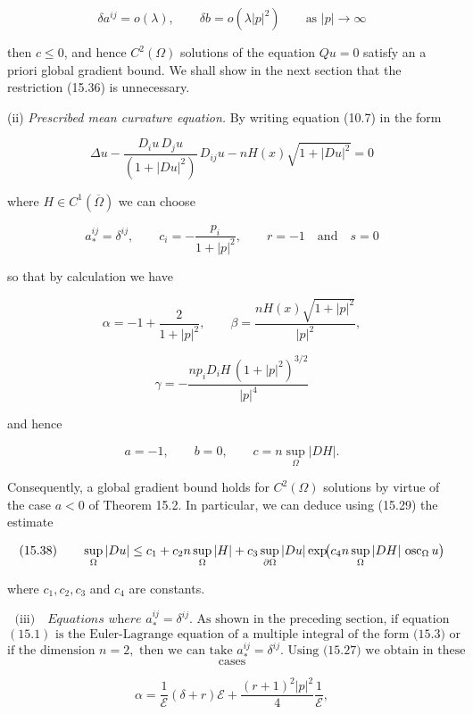 \begin{equation}
\tag{15.36}
\delta a^{ij}=o(\lambda), \qquad \delta b=o(\lambda|p|^2) \qquad \text{as } |p|\to\infty
\end{equation}

then $c\leq 0$, and hence $C^2(\Omega)$ solutions of the equation $Qu=0$ satisfy an a priori global gradient bound. We shall show in the next section that the restriction (15.36) is unnecessary.

(ii) \textit{Prescribed mean curvature equation.} By writing equation (10.7) in the form

\begin{equation}
\tag{15.37}
\Delta u-\frac{D_i u\, D_j u}{(1+|Du|^2)}\,D_{ij}u-nH(x)\sqrt{1+|Du|^2}=0
\end{equation}


where $H \in C^{1}(\overline{\Omega})$ we can choose

\[
a_{*}^{ij}=\delta^{ij}, \qquad c_i=-\frac{p_i}{1+|p|^{2}}, \qquad r=-1 \quad \text{and} \quad s=0
\]

so that by calculation we have

\[
\alpha=-1+\frac{2}{1+|p|^{2}}, \qquad \beta=\frac{n H(x)\sqrt{1+|p|^{2}}}{|p|^{2}},
\]

\[
\gamma=-\frac{n p_i D_i H \, (1+|p|^{2})^{3/2}}{|p|^{4}}
\]

and hence

\[
a=-1, \qquad b=0, \qquad c=n \sup_{\Omega} |DH|.
\]

Consequently, a global gradient bound holds for $C^{2}(\Omega)$ solutions by virtue of the case $a<0$ of Theorem 15.2. In particular, we can deduce using (15.29) the estimate

\[
(15.38)\qquad \sup_{\Omega} |Du| \le c_1 + c_2 n \sup_{\Omega} |H| + c_3 \sup_{\partial\Omega} |Du| \exp\!\bigl(c_4 n \sup_{\Omega} |DH| \, \operatorname{osc}_{\Omega} u\bigr)
\]

where $c_1, c_2, c_3$ and $c_4$ are constants.

\[
\text{(iii)}\quad \textit{Equations where } a_{*}^{ij}=\delta^{ij}.
\text{ As shown in the preceding section, if equation}
\]
\[
(15.1) \text{ is the Euler-Lagrange equation of a multiple integral of the form (15.3) or}
\]
\[
\text{if the dimension } n=2,\text{ then we can take } a_{*}^{ij}=\delta^{ij}. \text{ Using (15.27) we obtain in these}
\]
\[
\text{cases}
\]

\[
\alpha=\frac{1}{\mathscr{E}}(\delta+r)\mathscr{E}+\frac{(r+1)^{2}|p|^{2}}{4}\frac{1}{\mathscr{E}},
\]

